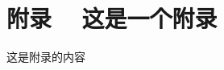 \documentclass[a4paper,12pt]{article}
\begin{document}




%
%
%
%
%




\section*{附录 ~ 这是一个附录}

这是附录的内容
\end{document}
